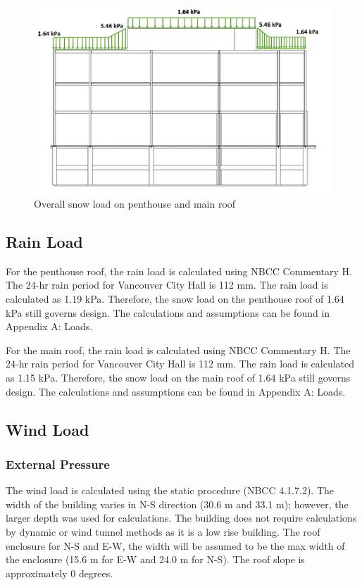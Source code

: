 \documentclass[12pt]{article}
\begin{document}
\begin{figure}[h!]
    \includegraphics[width=\linewidth]{Assets/snowdist.png}
    \caption{Overall snow load on penthouse and main roof}
    \label{fig:snowdist}
\end{figure}

\subsection{Rain Load}
For the penthouse roof, the rain load is calculated using NBCC Commentary H.
The 24-hr rain period for Vancouver City Hall is 112 mm.
The rain load is calculated as 1.19 kPa.
Therefore, the snow load on the penthouse roof of 1.64 kPa still governs design.
The calculations and assumptions can be found in Appendix A: Loads.

For the main roof, the rain load is calculated using NBCC Commentary H.
The 24-hr rain period for Vancouver City Hall is 112 mm.
The rain load is calculated as 1.15 kPa.
Therefore, the snow load on the main roof of 1.64 kPa still governs design.
The calculations and assumptions can be found in Appendix A: Loads.
\subsection{Wind Load}
\subsubsection{External Pressure}
The wind load is calculated using the static procedure (NBCC 4.1.7.2). The width of the building varies in N-S direction (30.6 m and 33.1 m); however, the larger depth was used for calculations. The building does not require calculations by dynamic or wind tunnel methods as it is a low rise building. The roof enclosure for N-S and E-W, the width will be assumed to be the max width of the enclosure (15.6 m for E-W and 24.0 m for N-S). The roof slope is approximately 0 degrees.
\end{document}

